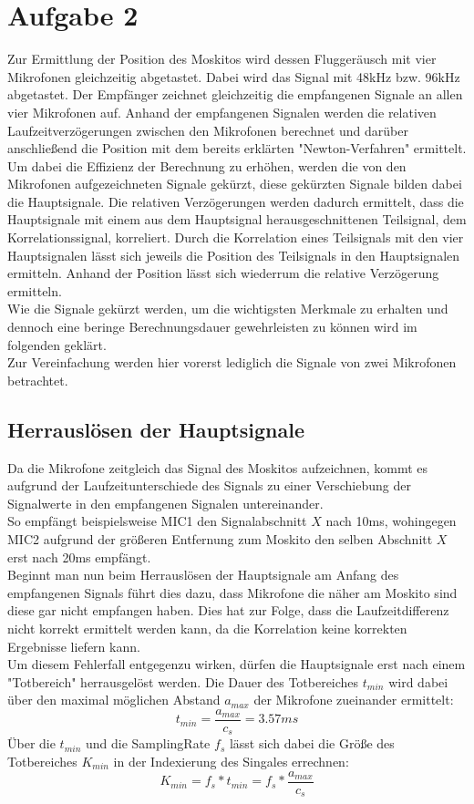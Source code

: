 \newpage
\section{Aufgabe 2}
Zur Ermittlung der Position des Moskitos wird dessen Fluggeräusch mit vier Mikrofonen gleichzeitig abgetastet.
Dabei wird das Signal mit 48kHz bzw. 96kHz abgetastet. 
Der Empfänger zeichnet gleichzeitig die empfangenen Signale an allen vier Mikrofonen auf. 
Anhand der empfangenen Signalen werden die relativen Laufzeitverzögerungen zwischen den Mikrofonen berechnet und darüber anschließend die Position mit dem bereits erklärten "Newton-Verfahren" ermittelt. Um dabei die Effizienz der Berechnung zu erhöhen, werden die von den Mikrofonen aufgezeichneten Signale gekürzt, diese gekürzten Signale bilden dabei die Hauptsignale. 
Die relativen Verzögerungen werden dadurch ermittelt, dass die Hauptsignale mit einem aus dem Hauptsignal herausgeschnittenen Teilsignal, dem Korrelationssignal, korreliert. Durch die Korrelation eines Teilsignals mit den vier Hauptsignalen lässt sich jeweils die Position des Teilsignals in den Hauptsignalen ermitteln. Anhand der Position lässt sich wiederrum die relative Verzögerung ermitteln. \\
Wie die Signale gekürzt werden, um die wichtigsten Merkmale zu erhalten und dennoch eine beringe Berechnungsdauer gewehrleisten zu können wird im folgenden geklärt.
\\ Zur Vereinfachung werden hier vorerst lediglich die Signale von zwei Mikrofonen betrachtet. 
\subsection{Herrauslösen der Hauptsignale} \label{sec:Eins}
Da die Mikrofone zeitgleich das Signal des Moskitos aufzeichnen, kommt es aufgrund der Laufzeitunterschiede des Signals zu einer Verschiebung der Signalwerte in den empfangenen Signalen untereinander. \\
So empfängt beispielsweise MIC1 den Signalabschnitt $X$ nach 10ms, wohingegen MIC2 aufgrund der größeren Entfernung zum Moskito den selben Abschnitt $X$ erst nach 20ms empfängt.\\
Beginnt man nun beim Herrauslösen der Hauptsignale am Anfang des empfangenen Signals führt dies dazu, dass Mikrofone die näher am Moskito sind diese gar nicht empfangen haben. Dies hat zur Folge, dass die Laufzeitdifferenz nicht korrekt ermittelt werden kann, da die Korrelation keine korrekten Ergebnisse liefern kann.\\
Um diesem Fehlerfall entgegenzu wirken, dürfen die Hauptsignale erst nach einem "Totbereich" herrausgelöst werden. Die Dauer des Totbereiches $t_{min}$ wird dabei über den maximal möglichen Abstand $a_{max}$ der Mikrofone zueinander ermittelt:
$$	t_{min} = \frac{a_{max}}{c_{s}} = 3.57 ms$$
Über die $t_{min}$ und die SamplingRate $f_s$ lässt sich dabei die Größe des Totbereiches $K_{min}$ in der Indexierung des Singales errechnen:
\begin{equation}
	K_{min} = f_s * t_{min}   = f_s * \frac{a_{max}}{c_{s}} \label{eq:A2A2E1}
\end{equation}

